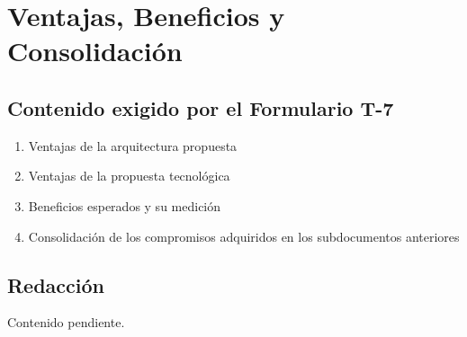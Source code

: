 \section{Ventajas, Beneficios y Consolidación}

%

\subsection{Contenido exigido por el Formulario T-7}

\begin{enumerate}
    \item Ventajas de la arquitectura propuesta
    \item Ventajas de la propuesta tecnológica
    \item Beneficios esperados y su medición
    \item Consolidación de los compromisos adquiridos en los subdocumentos anteriores
\end{enumerate}

\subsection{Redacción}

Contenido pendiente.
